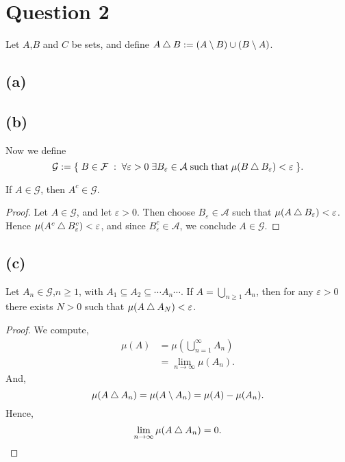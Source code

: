 \documentclass{unswmaths}
\begin{document}
\section*{Question 2}
Let $A$,$B$ and $C$ be sets, and define $A \bigtriangleup B := (A\setminus B)\cup (B\setminus A)$.
\subsection*{(a)}
\begin{lemma}
    
\end{lemma}

\subsection*{(b)}
Now we define
\begin{equation*}
    \mathcal{G} := \{\;B \in \mathcal{F}\;:\;\forall\varepsilon > 0\;\exists B_\varepsilon \in \mathcal{A}\;\text{such}\;\text{that}\;\mu(B\bigtriangleup B_\varepsilon) < \varepsilon\;\}.
\end{equation*}
\begin{lemma}
    If $A \in \mathcal{G}$, then $A^c \in \mathcal{G}$.
\end{lemma}
\begin{proof}
    Let $A \in \mathcal{G}$, and let $\varepsilon > 0$. Then choose $B_\varepsilon \in \mathcal{A}$
    such that $\mu(A \bigtriangleup B_\varepsilon) < \varepsilon$. Hence $\mu(A^c \bigtriangleup B^c_\varepsilon) < \varepsilon$,
    and since $B^c_\varepsilon \in \mathcal{A}$, we conclude $A \in \mathcal{G}$.
\end{proof}
\subsection*{(c)}
\begin{lemma}
    Let $A_n \in \mathcal{G}$,$n \geq 1$, with $A_1 \subseteq A_2 \subseteq \cdots A_n \cdots$. 
    If $A = \bigcup_{n\geq 1} A_n$, then 
    for any $\varepsilon > 0$ there exists $N > 0$ such that $\mu(A\bigtriangleup A_N) < \varepsilon$.
\end{lemma}
\begin{proof}
    We compute,
    \begin{align*}
        \mu(A) &= \mu(\bigcup_{n=1}^\infty A_n)\\
        &= \lim_{n\rightarrow\infty} \mu(A_n).
    \end{align*}
    And, 
    \begin{equation*}
        \mu(A\bigtriangleup A_n) = \mu(A\setminus A_n) = \mu(A)-\mu(A_n).
    \end{equation*}
    Hence,
    \begin{equation*}
        \lim_{n\rightarrow\infty} \mu(A\bigtriangleup A_n) = 0.
    \end{equation*}
\end{proof}
\end{document}

